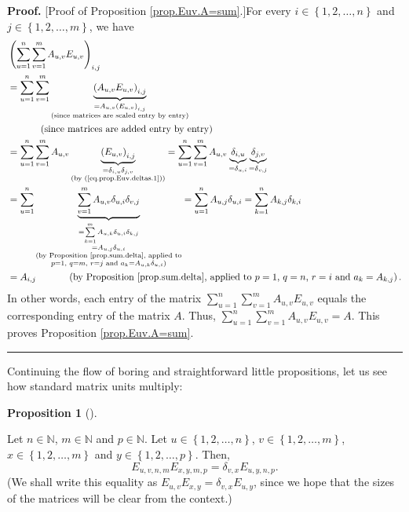 \documentclass[numbers=enddot,12pt,final,onecolumn,notitlepage]{scrartcl}%
\theoremstyle{definition}
\newtheorem{prop}[theo]{Proposition}
\newenvironment{proposition}[1][]
{\begin{prop}[#1]\begin{leftbar}}
{\end{leftbar}\end{prop}}
\newenvironment{proof}[1][Proof]{\noindent\textbf{#1.} }{\ \rule{0.5em}{0.5em}}
\let\sumnonlimits\sum
\renewcommand{\sum}{\sumnonlimits\limits}
\begin{document}
\begin{proof}
[Proof of Proposition \ref{prop.Euv.A=sum}.]For every $i\in\left\{
1,2,\ldots,n\right\}  $ and $j\in\left\{  1,2,\ldots,m\right\}  $, we have%
\begin{align*}
&  \left(  \sum_{u=1}^{n}\sum_{v=1}^{m}A_{u,v}E_{u,v}\right)  _{i,j}\\
&  =\sum_{u=1}^{n}\sum_{v=1}^{m}\underbrace{\left(  A_{u,v}E_{u,v}\right)
_{i,j}}_{\substack{=A_{u,v}\left(  E_{u,v}\right)  _{i,j}\\\text{(since
matrices are scaled entry by entry)}}}\\
&  \ \ \ \ \ \ \ \ \ \ \left(  \text{since matrices are added entry by
entry}\right) \\
&  =\sum_{u=1}^{n}\sum_{v=1}^{m}A_{u,v}\underbrace{\left(  E_{u,v}\right)
_{i,j}}_{\substack{=\delta_{i,u}\delta_{j,v}\\\text{(by
(\ref{eq.prop.Euv.deltas.1}))}}}=\sum_{u=1}^{n}\sum_{v=1}^{m}A_{u,v}%
\underbrace{\delta_{i,u}}_{=\delta_{u,i}}\underbrace{\delta_{j,v}}%
_{=\delta_{v,j}}\\
&  =\sum_{u=1}^{n}\underbrace{\sum_{v=1}^{m}A_{u,v}\delta_{u,i}\delta_{v,j}%
}_{\substack{=\sum_{k=1}^{m}A_{u,k}\delta_{u,i}\delta_{k,j}\\=A_{u,j}%
\delta_{u,i}\\\text{(by Proposition \ref{prop.sum.delta}, applied
to}\\p=1\text{, }q=m\text{, }r=j\text{ and }a_{k}=A_{u,k}\delta_{u,i}\text{)}%
}}=\sum_{u=1}^{n}A_{u,j}\delta_{u,i}=\sum_{k=1}^{n}A_{k,j}\delta_{k,i}\\
&  =A_{i,j}\ \ \ \ \ \ \ \ \ \ \left(  \text{by Proposition
\ref{prop.sum.delta}, applied to }p=1\text{, }q=n\text{, }r=i\text{ and }%
a_{k}=A_{k,j}\right)  .
\end{align*}
In other words, each entry of the matrix $\sum_{u=1}^{n}\sum_{v=1}^{m}%
A_{u,v}E_{u,v}$ equals the corresponding entry of the matrix $A$. Thus,
$\sum_{u=1}^{n}\sum_{v=1}^{m}A_{u,v}E_{u,v}=A$. This proves Proposition
\ref{prop.Euv.A=sum}.
\end{proof}

Continuing the flow of boring and straightforward little propositions, let us
see how standard matrix units multiply:

\begin{proposition}
\label{prop.Euv.prod}Let $n\in\mathbb{N}$, $m\in\mathbb{N}$ and $p\in
\mathbb{N}$. Let $u\in\left\{  1,2,\ldots,n\right\}  $, $v\in\left\{
1,2,\ldots,m\right\}  $, $x\in\left\{  1,2,\ldots,m\right\}  $ and
$y\in\left\{  1,2,\ldots,p\right\}  $. Then,
\[
E_{u,v,n,m}E_{x,y,m,p}=\delta_{v,x}E_{u,y,n,p}.
\]
(We shall write this equality as $E_{u,v}E_{x,y}=\delta_{v,x}E_{u,y}$, since
we hope that the sizes of the matrices will be clear from the context.)
\end{proposition}
\end{document}
